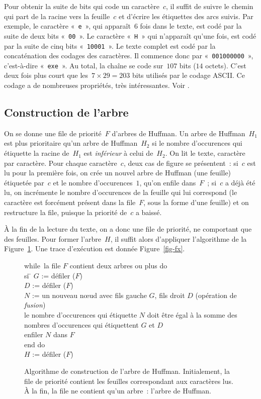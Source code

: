\documentclass[12pt]{article}
\newcommand{\algf}{\sffamily }
\newcommand{\WHILE}{{\algf while}}
\newcommand{\DO}{{\algf do}}
\newcommand{\OD}{{\algf end do}}
\newcommand{\INDENTER}{{\algf si} \=\+\kill}
\newcounter{points_counter}
\newcounter{section_points_counter}
\begin{document}
Pour obtenir la suite de bits qui code un caractère~$c$, il suffit de 
suivre le chemin qui part de la racine vers la feuille~$c$ et d'écrire
les étiquettes des arcs suivis. Par exemple, le caractère «~{\tt e}~»,
qui apparaît~$6$ fois dans le texte, est codé par la suite de deux 
bits «~{\tt 00}~». Le caractère «~{\tt H}~» qui n'apparaît qu'une fois,
est codé par la suite de cinq bits «~{\tt 10001}~». Le texte complet
est codé par la concaténation des codages des caractères. Il
commence donc par «~{\tt 001000000}~», c'est-à-dire «~{\tt exe}~».
Au total, la chaîne se code sur~$107$ bits ($14$ octets).
C'est deux fois plus court que les~$7 \times 29 = 203$ bits utilisés
par le codage ASCII. 
Ce codage a de nombreuses propriétés, très intéressantes.
Voir \cite[chapitre 16.3]{CLRS02}.

\subsection*{Construction de l'arbre}

On se donne une file de priorité~$F$ d'arbres de Huffman.
Un arbre de Huffman~$H_1$ est plus prioritaire qu'un arbre de Huffman~$H_2$
si le nombre d'occurences qui étiquette la racine de~$H_1$ est {\em inférieur}
à celui de~$H_2$.
On lit le texte, caractère par caractère.
Pour chaque caractère~$c$, deux cas de figure se présentent~:
si~$c$ est lu pour la première fois, on crée un nouvel arbre de Huffman
(une feuille) étiquetée par~$c$ et le nombre d'occurences~$1$, qu'on
enfile dans~$F$~; si~$c$ a déjà été lu, on incrémente le nombre
d'occurences de la feuille qui lui correspond (le caractère est
forcément présent dans la file~$F$, sous la forme d'une feuille)
et on restructure la file, puisque la priorité de~$c$ a baissé.

À la fin de la lecture du texte, on a donc une file de priorité, ne
comportant que des feuilles. Pour former l'arbre~$H$, il suffit alors
d'appliquer l'algorithme de la Figure~\ref{fig-code}. 
Une trace d'exécution est donnée
Figure~\ref{fig-fx}.
\begin{figure}[h!t]
\begin{tabbing}
\WHILE\ la file $F$ contient deux arbres ou plus \DO \\
\INDENTER
    $G$ := défiler ($F$) \\
    $D$ := défiler ($F$) \\
    $N$ := un nouveau nœud avec fils gauche $G$, fils droit $D$ (opération de {\em fusion}) \\
    le nombre d'occurences qui étiquette $N$ doit être égal à la 
	somme des \\ \qquad nombres d'occurences qui étiquettent $G$ et $D$ \\
    enfiler $N$ dans $F$ \-\\
\OD \\
$H$ := défiler ($F$)
\end{tabbing}
\caption{\footnotesize Algorithme de construction de l'arbre de Huffman. Initialement, la file de priorité contient les feuilles correspondant aux caractères lus. À la fin, la file ne contient qu'un arbre~: l'arbre de Huffman.}
\label{fig-code}
\end{figure}
\end{document}
